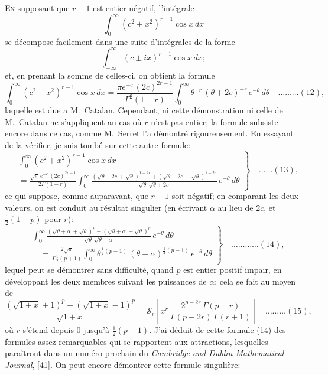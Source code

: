 \documentclass[12pt,a4paper]{article}
\theoremstyle{plain}
\begin{document}
\textsc{En} supposant que $r - 1$ est entier n\'egatif, l'int\'egrale
\[
\int_0^{\infty} (c^2 + x^2)^{r-1} \cos x \, dx
\]
se d\'ecompose facilement dans une suite d'int\'egrales de la forme
\[
\int_{-\infty}^{\infty} (c \pm ix)^{r-1} \cos x \, dx;
\]
et, en prenant la somme de celles-ci, on obtient la formule
\[
\int_0^{\infty} (c^2 + x^2)^{r-1} \cos x \, dx = \frac{\pi e^{-c}\, (2c)^{2r-1}}{\Gamma^2(1-r)} \int_0^{\infty} \theta^{-r}\,(\theta + 2c)^{-r}\, e^{-\theta}\, d\theta \quad \ldots \ldots \ldots (12),
\]
laquelle est due a M.~Catalan. Cependant, ni cette d\'emonstration ni celle de M.~Catalan ne s'appliquent au cas o\`u $r$ n'est pas entier; la formule subsiste encore dans ce cas, comme M.~Serret l'a d\'emontr\'e rigoureusement. En essayant de la v\'erifier, je suis tomb\'e sur cette autre formule:
\[
\left. \begin{aligned}
&\int_0^{\infty} (c^2 + x^2)^{r-1} \cos x \, dx \\
&= \frac{\sqrt{\pi}\, e^{-c}\, (2c)^{2r-1}}{2\Gamma(1-r)} \int_0^{\infty} \frac{(\sqrt{\theta + 2c} + \sqrt{\theta})^{1-2r} + (\sqrt{\theta + 2c} - \sqrt{\theta})^{1-2r}}{\sqrt{\theta}\, \sqrt{\theta + 2c}} \, e^{-\theta}\, d\theta
\end{aligned} \right\} \quad \ldots \ldots (13),
\]
ce qui suppose, comme auparavant, que $r - 1$ soit n\'egatif; en comparant les deux valeurs, on est conduit au r\'esultat singulier (en \'ecrivant $\alpha$ au lieu de $2c$, et $\frac{1}{2}(1-p)$ pour $r$):
\[
\left. \begin{aligned}
&\int_0^{\infty} \frac{(\sqrt{\theta + \alpha} + \sqrt{\theta})^p + (\sqrt{\theta + \alpha} - \sqrt{\theta})^p}{\sqrt{\theta}\, \sqrt{\theta + \alpha}} \, e^{-\theta}\, d\theta \\
&\quad = \frac{2\sqrt{\pi}}{\Gamma\frac{1}{2}(p+1)} \int_0^{\infty} \theta^{\frac{1}{2}(p-1)}\, (\theta + \alpha)^{\frac{1}{2}(p-1)}\, e^{-\theta}\, d\theta
\end{aligned} \right\} \quad \ldots \ldots \ldots \ldots (14),
\]
lequel peut se d\'emontrer sans difficult\'e, quand $p$ est entier positif impair, en d\'eveloppant les deux membres suivant les puissances de $\alpha$; cela se fait au moyen de
\[
\frac{(\sqrt{1+x} + 1)^p + (\sqrt{1+x} - 1)^p}{\sqrt{1+x}} = \mathcal{S}_r \left[ x^r \, \frac{2^{p-2r}\, \Gamma(p-r)}{\Gamma(p-2r)\, \Gamma(r+1)} \right] \quad \ldots \ldots \ldots (15),
\]
o\`u $r$ s'\'etend depuis $0$ jusqu'\`a $\frac{1}{2}(p-1)$. J'ai d\'eduit de cette formule (14) des formules assez remarquables qui se rapportent aux attractions, lesquelles para\^itront dans un num\'ero prochain du \textit{Cambridge and Dublin Mathematical Journal}, [41]. On peut encore d\'emontrer cette formule singuli\`ere:
\end{document}
